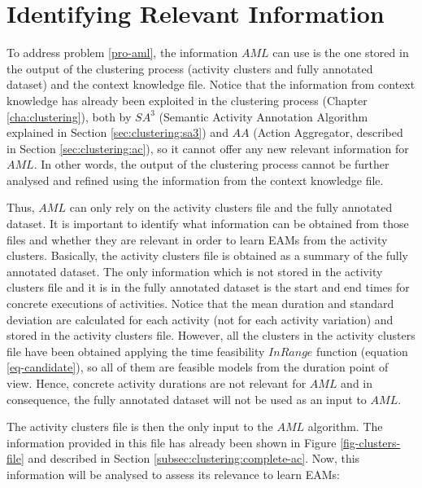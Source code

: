 \section{Identifying Relevant Information}
\label{sec:learner:relevant}


To address problem \ref{pro-aml}, the information $AML$ can use is the one stored in the output of the clustering process (activity clusters and fully annotated dataset) and the context knowledge file. Notice that the information from context knowledge has already been exploited in the clustering process (Chapter \ref{cha:clustering}), both by $SA^3$ (Semantic Activity Annotation Algorithm explained in Section \ref{sec:clustering:sa3}) and $AA$ (Action Aggregator, described in Section \ref{sec:clustering:ac}), so it cannot offer any new relevant information for $AML$. In other words, the output of the clustering process cannot be further analysed and refined using the information from the context knowledge file.

Thus, $AML$ can only rely on the activity clusters file and the fully annotated dataset. It is important to identify what information can be obtained from those files and whether they are relevant in order to learn EAMs from the activity clusters. Basically, the activity clusters file is obtained as a summary of the fully annotated dataset. The only information which is not stored in the activity clusters file and it is in the fully annotated dataset is the start and end times for concrete executions of activities. Notice that the mean duration and standard deviation are calculated for each activity (not for each activity variation) and stored in the activity clusters file. However, all the clusters in the activity clusters file have been obtained applying the time feasibility $InRange$ function (equation \ref{eq-candidate}), so all of them are feasible models from the duration point of view. Hence, concrete activity durations are not relevant for $AML$ and in consequence, the fully annotated dataset will not be used as an input to $AML$.

The activity clusters file is then the only input to the $AML$ algorithm. The information provided in this file has already been shown in Figure \ref{fig-clusters-file} and described in Section \ref{subsec:clustering:complete-ac}. Now, this information will be analysed to assess its relevance to learn EAMs:

